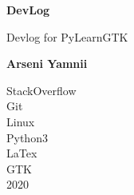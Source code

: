 \documentclass{article}
\begin{document}
\begin{titlepage}
   \begin{center}
       \vspace*{1cm}

       \textbf{DevLog}

       \vspace{0.5cm}
        Devlog for PyLearnGTK

       \vspace{1.5cm}

       \textbf{Arseni Yamnii}

       \vfill


       \vspace{0.8cm}



       StackOverflow\\
       Git\\
       Linux\\
       Python3\\
       LaTex\\
       GTK\\
       2020

   \end{center}
\end{titlepage}
\tableofcontents
\end{document}
